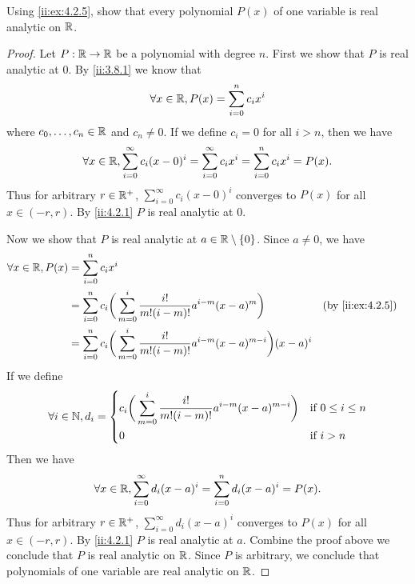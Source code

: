 \begin{ex}\label{ii:ex:4.2.6}
  Using \cref{ii:ex:4.2.5}, show that every polynomial \(P(x)\) of one variable is real analytic on \(\mathbb{R}\).
\end{ex}

\begin{proof}
  Let \(P : \mathbb{R} \to \mathbb{R}\) be a polynomial with degree \(n\).
  First we show that \(P\) is real analytic at \(0\).
  By \cref{ii:3.8.1} we know that
  \[
    \forall x \in \mathbb{R}, P(x) = \sum_{i = 0}^n c_i x^i
  \]
  where \(c_0, \dots, c_n \in \mathbb{R}\) and \(c_n \neq 0\).
  If we define \(c_i = 0\) for all \(i > n\), then we have
  \[
    \forall x \in \mathbb{R}, \sum_{i = 0}^\infty c_i (x - 0)^i = \sum_{i = 0}^\infty c_i x^i = \sum_{i = 0}^n c_i x^i = P(x).
  \]
  Thus for arbitrary \(r \in \mathbb{R}^+\), \(\sum_{i = 0}^\infty c_i (x - 0)^i\) converges to \(P(x)\) for all \(x \in (-r, r)\).
  By \cref{ii:4.2.1} \(P\) is real analytic at \(0\).

  Now we show that \(P\) is real analytic at \(a \in \mathbb{R} \setminus \left\lbrace0\right\rbrace\).
  Since \(a \neq 0\), we have
  \begin{align*}
    \forall x \in \R, P(x) & = \sum_{i = 0}^n c_i x^i                                                                                                          \\
                           & = \sum_{i = 0}^n c_i \bigg(\sum_{m = 0}^i \dfrac{i!}{m! (i - m)!} a^{i - m} (x - a)^m\bigg)                 &  & \by{ii:ex:4.2.5} \\
                           & = \sum_{i = 0}^n c_i \bigg(\sum_{m = 0}^i \dfrac{i!}{m! (i - m)!} a^{i - m} (x - a)^{m - i}\bigg) (x - a)^i
  \end{align*}
  If we define
  \[
    \forall i \in \mathbb{N}, d_i = \begin{dcases}
      c_i \bigg(\sum_{m = 0}^i \dfrac{i!}{m! (i - m)!} a^{i - m} (x - a)^{m - i}\bigg) & \text{if } 0 \leq i \leq n \\
      0                                                                                & \text{if } i > n
    \end{dcases}
  \]
  Then we have
  \[
    \forall x \in \mathbb{R}, \sum_{i = 0}^\infty d_i (x - a)^i = \sum_{i = 0}^n d_i (x - a)^i = P(x).
  \]
  Thus for arbitrary \(r \in \mathbb{R}^+\), \(\sum_{i = 0}^\infty d_i (x - a)^i\) converges to \(P(x)\) for all \(x \in (-r, r)\).
  By \cref{ii:4.2.1} \(P\) is real analytic at \(a\).
  Combine the proof above we conclude that \(P\) is real analytic on \(\mathbb{R}\).
  Since \(P\) is arbitrary, we conclude that polynomials of one variable are real analytic on \(\mathbb{R}\).
\end{proof}

